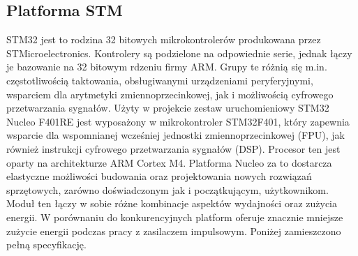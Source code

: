 \subsection{Platforma STM} \label{sec:stm}
STM32 jest to rodzina 32 bitowych mikrokontrolerów produkowana przez STMicroelectronics.
Kontrolery są podzielone na odpowiednie serie, jednak łączy je bazowanie na 32 bitowym
rdzeniu firmy ARM. Grupy te różnią się m.in. częstotliwością taktowania, obsługiwanymi
urządzeniami peryferyjnymi, wsparciem dla arytmetyki zmiennoprzecinkowej, jak i możliwością
cyfrowego przetwarzania sygnałów.
Użyty w projekcie zestaw uruchomieniowy STM32 Nucleo F401RE jest wyposażony w mikrokontroler
STM32F401, który zapewnia wsparcie dla wspomnianej wcześniej jednostki zmiennoprzecinkowej (FPU),
jak również instrukcji cyfrowego przetwarzania sygnałów (DSP). Procesor ten jest oparty na
architekturze ARM Cortex M4. Platforma Nucleo za to dostarcza elastyczne
możliwości budowania oraz projektowania nowych rozwiązań sprzętowych, zarówno
doświadczonym jak i początkującym, użytkownikom. Moduł ten łączy w sobie różne kombinacje
aspektów wydajności oraz zużycia energii. W porównaniu do konkurencyjnych platform oferuje
znacznie mniejsze zużycie energii podczas pracy z zasilaczem impulsowym.
Poniżej zamieszczono pełną specyfikację.
